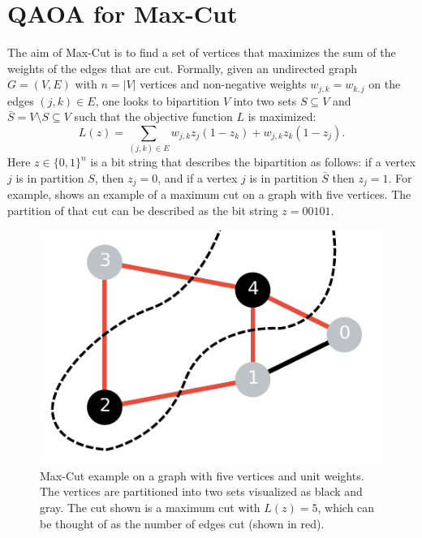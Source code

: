 \chapter{QAOA for Max-Cut}
The aim of Max-Cut is to find a set of vertices that maximizes the sum of the weights of the edges that are cut.
Formally, given an undirected graph $G = (V, E)$ with $n = |V|$ vertices and non-negative weights $w_{j, k} = w_{k, j}$ on the edges $(j, k) \in E$, one looks to bipartition $V$ into two sets $S \subseteq V$ and $\bar{S} = V \setminus S \subseteq V$ such that the objective function $L$ is maximized:
\begin{equation} \label{eqn:max-cut-objective}
L(z) = \sum_{(j, k) \in E} w_{j, k}z_j(1 - z_k) + w_{j, k} z_k(1 - z_j).
\end{equation}
Here $z \in \{0, 1\}^n$ is a bit string that describes the bipartition as follows: if a vertex $j$ is in partition $S$, then $z_j = 0$, and if a vertex $j$ is in partition $\bar{S}$ then $z_j = 1$.
For example,  shows an example of a maximum cut on a graph with five vertices.
The partition of that cut can be described as the bit string $z = 00101$.
\begin{figure}[ht]
    \centering
    \includegraphics[width=0.4\linewidth]{figures/maxcut_5_graph_cut_example.pdf}
    \caption[Max-Cut example on a graph with five vertices and unit weights.]{
        Max-Cut example on a graph with five vertices and unit weights.
        The vertices are partitioned into two sets visualized as black and gray.
        The cut shown is a maximum cut with $L(z) = 5$, which can be thought of as the number of edges cut (shown in red).
    }
    \label{fig:maxcut-5-example}
\end{figure}

